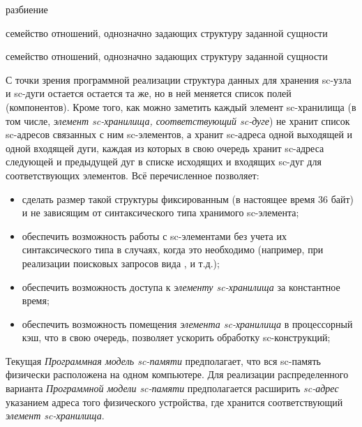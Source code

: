 \begin{SCn}
\begin{scnrelfromset}{разбиение}
\begin{scnindent}
\begin{scnrelfromset}{семейство отношений, однозначно задающих структуру заданной сущности}
\begin{scnindent}
\begin{scnindent}
\begin{scnrelfromset}{семейство отношений, однозначно задающих структуру заданной сущности}
                    \end{scnrelfromset}
                \end{scnindent}
            \end{scnindent}
        \end{scnrelfromset}
    \end{scnindent}
\end{scnrelfromset}
\end{SCn}

С точки зрения программной реализации структура данных для хранения sc-узла и sc-дуги остается остается та же, но в
ней меняется список полей (компонентов).
Кроме того, как можно заметить каждый элемент sc-хранилища (в том числе, \textit{элемент sc-хранилища, соответствующий
sc-дуге}) не хранит список sc-адресов связанных с ним sc-элементов, а хранит sc-адреса одной выходящей и одной
входящей дуги, каждая из которых в свою очередь хранит sc-адреса следующей и предыдущей дуг в списке исходящих и
входящих sc-дуг для соответствующих элементов. Всё перечисленное позволяет:

\begin{itemize}
    \item сделать размер такой структуры фиксированным (в настоящее время 36 байт) и не зависящим от синтаксического
    типа хранимого sc-элемента;
    \item обеспечить возможность работы с sc-элементами без учета их синтаксического типа в случаях, когда это необходимо
    (например, при реализации поисковых запросов вида ,
     и т.д.);
    \item обеспечить возможность доступа к \textit{элементу sc-хранилища} за константное время;
    \item обеспечить возможность помещения \textit{элемента sc-хранилища} в процессорный кэш, что в свою очередь,
    позволяет ускорить обработку sc-конструкций;
\end{itemize}

Текущая \textit{Программная модель sc-памяти} предполагает, что вся sc-память физически расположена на одном компьютере.
Для реализации распределенного варианта \textit{Программной модели sc-памяти} предполагается расширить \textit{sc-адрес}
указанием адреса того физического устройства, где хранится соответствующий \textit{элемент sc-хранилища}.

